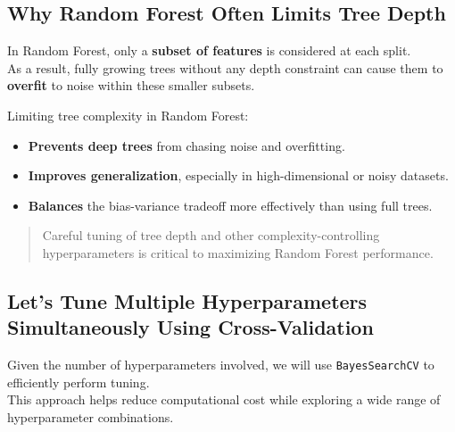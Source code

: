 \documentclass[
  letterpaper,
  DIV=11,
  numbers=noendperiod]{scrreprt}
\providecommand{\tightlist}{%
  \setlength{\itemsep}{0pt}\setlength{\parskip}{0pt}}\usepackage{longtable,booktabs,array}
\begin{document}
\subsection{Why Random Forest Often Limits Tree
Depth}\label{why-random-forest-often-limits-tree-depth}

In Random Forest, only a \textbf{subset of features} is considered at
each split.\\
As a result, fully growing trees without any depth constraint can cause
them to \textbf{overfit} to noise within these smaller subsets.

Limiting tree complexity in Random Forest:

\begin{itemize}
\tightlist
\item
  \textbf{Prevents deep trees} from chasing noise and overfitting.
\item
  \textbf{Improves generalization}, especially in high-dimensional or
  noisy datasets.
\item
  \textbf{Balances} the bias-variance tradeoff more effectively than
  using full trees.
\end{itemize}

\begin{quote}
Careful tuning of tree depth and other complexity-controlling
hyperparameters is critical to maximizing Random Forest performance.
\end{quote}

\subsection{Let's Tune Multiple Hyperparameters Simultaneously Using
Cross-Validation}\label{lets-tune-multiple-hyperparameters-simultaneously-using-cross-validation}

Given the number of hyperparameters involved, we will use
\texttt{BayesSearchCV} to efficiently perform tuning.\\
This approach helps reduce computational cost while exploring a wide
range of hyperparameter combinations.
\end{document}

